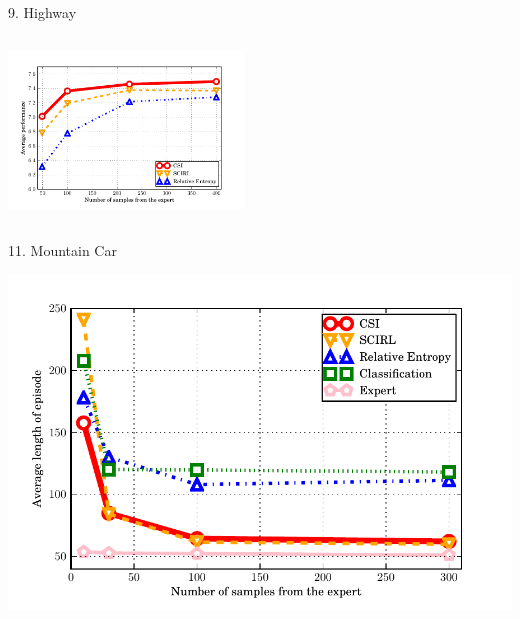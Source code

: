 \documentclass[xcolor=x11names,12pt]{beamer}
\begin{document}
\begin{frame}
\begin{columns}
\begin{column}{.48\textwidth}
\begin{block}{9. Highway}
\begin{columns}
\begin{column}{\textwidth}
{            \includegraphics[width=0.47\textwidth]{Exp14_zoom}}
        \end{column}
      \end{columns}             
    \end{block}
    \begin{block}{11. Mountain Car}
      \centering
      
      \includegraphics[width=\textwidth]{Exp11}
    \end{block}
  \end{column}
\end{columns}
\vfill



\end{frame}
\end{document}
